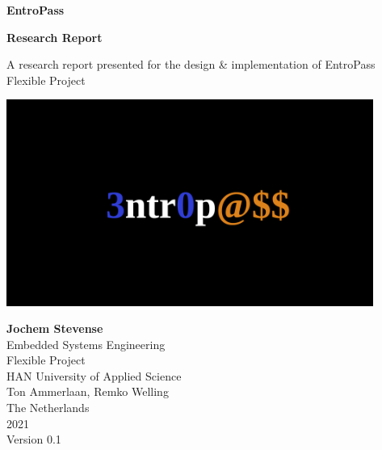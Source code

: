 \documentclass[a4paper,12pt]{article}
\begin{document}
\begin{titlepage}
  \begin{center}
    \vspace*{1cm}

    \Huge
    \textbf{EntroPass}

    \vspace{0.5cm}
    \LARGE
    \textbf{Research Report}


    \Large
    A research report presented for the design \& implementation of EntroPass\\
    \normalsize
    Flexible Project

    \vspace{0.8cm}

    \includegraphics[width=0.9\textwidth]{entropass}

  \end{center}
  \vfill  
  \vspace{1.5cm}

  \textbf{Jochem Stevense}\\
  \normalsize
  Embedded Systems Engineering\\
  Flexible Project\\
  HAN University of Applied Science\\
  Ton Ammerlaan, Remko Welling\\
  The Netherlands\\
  2021\\
  Version 0.1
\end{titlepage}
\end{document}
